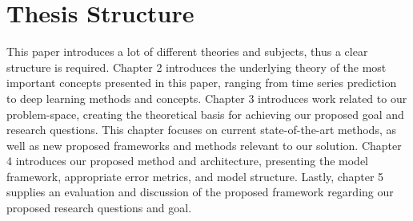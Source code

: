 
\section{Thesis Structure}
\label{sections:Introduction:Structure}

This paper introduces a lot of different theories and subjects,
thus a clear structure is required.
Chapter 2 introduces the underlying theory of the most important concepts presented in this paper,
ranging from time series prediction to deep learning methods and concepts.
Chapter 3 introduces work related to our problem-space, creating the theoretical basis for achieving our proposed goal and research questions.
This chapter focuses on current state-of-the-art methods,
as well as new proposed frameworks and methods relevant to our solution.
Chapter 4 introduces our proposed method and architecture,
presenting the model framework, appropriate error metrics, and model structure.
Lastly, chapter 5 supplies an evaluation and discussion of the proposed framework regarding our proposed research questions and goal.


\iffalse
  This section provides the reader with an overview of what is coming in the next chapters.
  You want to say more than what is explicit in the chapter name,
  if possible, but still keep the description short and to the point.
\fi
